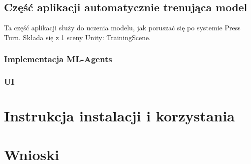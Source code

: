 \documentclass{SGGW-thesis}
\begin{document}
\section{Część aplikacji automatycznie trenująca model}
Ta część aplikacji służy do uczenia modelu, jak poruszać się po systemie Press Turn. Składa się z 1 sceny Unity: TrainingScene.


\subsection{Implementacja ML-Agents}


\subsection{UI}


\chapter{Instrukcja instalacji i korzystania}


\chapter{Wnioski}
\end{document}
